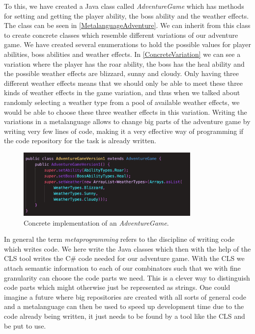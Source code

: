 To this, we have created a Java class called \textit{AdventureGame} which has methods for setting and getting the player ability, the boss ability and the weather effects. The class can be seen in \autoref{MetalanguageAdventure}. We can inherit from this class to create concrete classes which resemble different variations of our adventure game. We have created several enumerations to hold the possible values for player abilities, boss abilities and weather effects. In \autoref{ConcreteVariation} we can see a variation where the player has the roar ability, the boss has the heal ability and the possible weather effects are blizzard, sunny and cloudy. Only having three different weather effects means that we should only be able to meet these three kinds of weather effects in the game variation, and thus when we talked about randomly selecting a weather type from a pool of available weather effects, we would be able to choose these three weather effects in this variation. Writing the variations in a metalanguage allows to change big parts of the adventure game by writing very few lines of code, making it a very effective way of programming if the code repository for the task is already written.
\begin{figure}[H]
	\centering
	\includegraphics[width=0.8\textwidth]{Materials/Adventuregame/Version1}
	\caption{Concrete implementation of an \textit{AdventureGame}.}
	\label{ConcreteVariation}
\end{figure}

In general the term \textit{metaprogramming} refers to the discipline of writing code which writes code. We here write the Java classes which then with the help of the CLS tool writes the C\# code needed for our adventure game. With the CLS we attach semantic information to each of our combinators such that we with fine granularity can choose the code parts we need. This is a clever way to distinguish code parts which might otherwise just be represented as strings. One could imagine a future where big repositories are created with all sorts of general code and a metalanguage can then be used to speed up development time due to the code already being written, it just needs to be found by a tool like the CLS and be put to use. 
